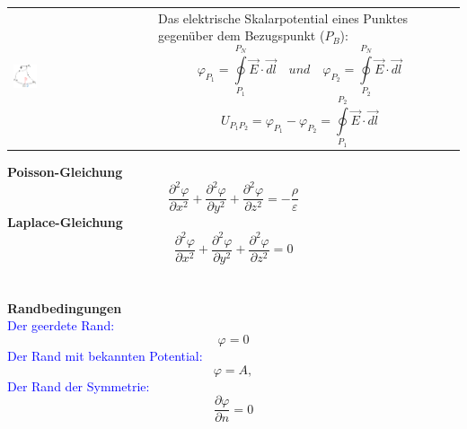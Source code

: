 \begin{tabular}[h]{ C{.23\linewidth} P{.53\linewidth} P{.22\linewidth} }
	{\vspace{0pt}\includegraphics[width = 0.18\textwidth]{images/Skalarpotential}} & {\scriptsize Das elektrische Skalarpotential eines Punktes gegenüber dem Bezugspunkt ($P_B$):} \newline \newline \[ \varphi_{P_1} = \oint\limits_{P_1}^{P_N}\vec{E}\cdot\vec{dl}\quad und \quad \varphi_{P_2} = \oint\limits_{P_2}^{P_N}\vec{E}\cdot\vec{dl} \] \[ U_{P_1P_2} = \varphi_{P_1} - \varphi_{P_2} = \oint\limits_{P_1}^{P_2}\vec{E}\cdot\vec{dl} \] & \\
\end{tabular}
\begin{multicols}{2}
	\textbf{Poisson-Gleichung}  \[ \dfrac{\partial^2\varphi}{\partial x^2} +  \dfrac{\partial^2\varphi}{\partial y^2} + \dfrac{\partial^2\varphi}{\partial z^2} = -\dfrac{\rho}{\varepsilon} \]
	\textbf{Laplace-Gleichung}  \[ \dfrac{\partial^2\varphi}{\partial x^2} +  \dfrac{\partial^2\varphi}{\partial y^2} + \dfrac{\partial^2\varphi}{\partial z^2} = 0 \]
	\\
	\\
	\textbf{Randbedingungen} \\
	\textcolor{blue}{Der geerdete Rand:} \[\varphi = 0\] 
	\textcolor{blue}{Der Rand mit bekannten Potential:} \[ \varphi = A, \]
	\textcolor{blue}{Der Rand der Symmetrie:} \[ \dfrac{\partial\varphi}{\partial n} = 0\] 
\end{multicols}
\clearpage





\clearpage
\pagebreak